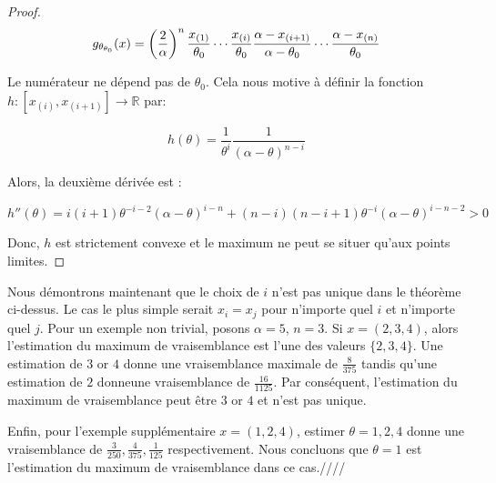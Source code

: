 \documentclass[../main.tex]{subfiles}
\begin{document}
\begin{CJK*}{UTF8}{gbsn}
\begin{proof}
\begin{equation*}
    g_{\theta_{\theta_0}}(x) = \left ( \frac{2}{\alpha} \right )^n  \frac{x_{(1)}}{\theta_0} \cdots \frac{x_{(i)}}{\theta_0}
    \frac{\alpha-x_{(i+1)}}{\alpha - \theta_0} \cdots \frac{\alpha-x_{(n)}}{\theta_0}
\end{equation*}

Le numérateur ne dépend pas de $\theta_0$.
Cela nous motive à définir la fonction $h: [x_{(i)}, x_{(i+1)}] \to \mathbb{R}$ par:

\begin{equation*}
    h(\theta) = \frac{1}{\theta^i} \frac{1}{(\alpha-\theta)^{n-i}}
\end{equation*}

Alors, la deuxième dérivée est :

\begin{equation*}
    h''(\theta) = i(i+1)\theta^{-i-2} (\alpha-\theta)^{i-n} + (n-i)(n-i+1)\theta^{-i} (\alpha-\theta)^{i-n-2} > 0
\end{equation*}

Donc, $h$ est strictement convexe et le maximum ne peut se situer qu'aux points limites.
\end{proof}

Nous démontrons maintenant que le choix de $i$ n'est pas unique dans le théorème ci-dessus.
Le cas le plus simple serait $x_i=x_j$ pour n'importe quel $i$ et n'importe quel $j$. 
Pour un exemple non trivial, posons $\alpha = 5$, $n = 3$.
Si $x=(2,3,4)$, alors l'estimation du maximum de vraisemblance est l'une des valeurs $\{2,3,4\}$.
Une estimation de $3$ or $4$ donne une vraisemblance maximale de $\frac{8}{375}$ tandis qu'une estimation de $2$ donneune vraisemblance de $\frac{16}{1125}$.
Par conséquent, l'estimation du maximum de vraisemblance peut être $3$ or $4$ et n'est pas unique.

Enfin, pour l'exemple supplémentaire $x=(1,2,4)$, estimer $\theta=1,2,4$  donne une vraisemblance de
$\frac{3}{250}, \frac{4}{375}, \frac{1}{125}$
respectivement. Nous concluons que $\theta=1$ est l'estimation du maximum de vraisemblance dans ce cas.////
\end{CJK*}
\end{document}

